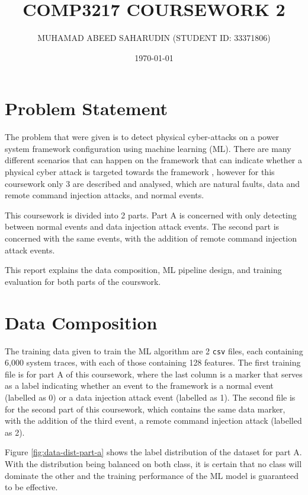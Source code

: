 \documentclass[12pt]{article}
\title{COMP3217 COURSEWORK 2}
\author{MUHAMAD ABEED SAHARUDIN (STUDENT ID: 33371806)}
\date{\today}
\begin{document}
    \maketitle

    \section{Problem Statement}

        The problem that were given is to detect physical cyber-attacks on a power system framework configuration using 
        machine learning (ML). There are many different scenarios that can happen on the framework that can indicate
        whether a physical cyber attack is targeted towards the framework \cite{cw-readme}, however for this coursework 
        only 3 are described and analysed, which are natural faults, data and remote command injection attacks, and
        normal events.

        This coursework is divided into 2 parts. Part A is concerned with only detecting between normal events and data
        injection attack events. The second part is concerned with the same events, with the addition of remote command
        injection attack events.
        
        This report explains the data composition, ML pipeline design, and training evaluation for both parts of the 
        courswork.

    \section{Data Composition}

        The training data given to train the ML algorithm are 2 \verb|csv| files, each containing 6,000 system traces, 
        with each of those containing 128 features. The first training file is for part A of this coursework, where the
        last column is a marker that serves as a label indicating whether an event to the framework is a normal event 
        (labelled as 0) or a data injection attack event (labelled as 1). The second file is for the second part of 
        this coursework, which contains the same data marker, with the addition of the third event, a remote command 
        injection attack (labelled as 2).

        Figure \ref{fig:data-dist-part-a} shows the label distribution of the dataset for part A. With the distribution 
        being balanced on both class, it is certain that no class will dominate the other and the training performance 
        of the ML model is guaranteed to be effective.
\end{document}

